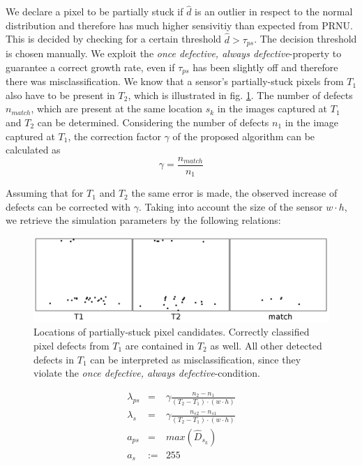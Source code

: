 \documentclass[10pt,twocolumn,letterpaper]{article}
\begin{document}
We declare a pixel to be partially stuck if $\hat{d}$ is an outlier in respect to the normal distribution and therefore has much higher sensivitiy than expected from PRNU. This is decided by checking for a certain threshold $\hat{d} > \tau_{ps}$. The decision threshold is chosen manually. We exploit the \emph{once defective, always defective}-property to guarantee a correct growth rate, even if $\tau_{ps}$ has been slightly off and therefore there was misclassification. We know that a sensor's partially-stuck pixels from $T_1$ also have to be present in $T_2$, which is illustrated in fig. \ref{fig:defectPersistence}. The number of defects $n_{match}$, which are present at the same location $s_k$ in the images captured at $T_1$ and $T_2$ can be determined. Considering the number of defects $n_1$ in the image captured at $T_1$, the correction factor $\gamma$ of the proposed algorithm can be calculated as
\begin{equation}
\gamma = \frac{n_{match}}{n_1}
\end{equation}

Assuming that for $T_1$ and $T_2$ the same error is made, the observed increase of defects can be corrected with $\gamma$. Taking into account the size of the sensor $w\cdot h$, we retrieve the simulation parameters by the following relations: 

\begin{figure}
  \centering
  \includegraphics[width=\linewidth]{img/detectedLocations.png}
  \caption{Locations of partially-stuck pixel candidates. Correctly classified pixel defects from $T_1$ are contained in $T_2$ as well. All other detected defects in $T_1$ can be interpreted as misclassification, since they violate the \emph{once defective, always defective}-condition.}
  \label{fig:defectPersistence}
\end{figure}


\begin{eqnarray}
 \lambda_{ps} 	& = 	& \gamma \frac{n_2-n_1}{(T_2-T_1)\cdot(w \cdot h)} \\ 
 \lambda_{s} 	& = 	& \gamma  \frac{n_{s2}-n_{s1}}{(T_2-T_1)\cdot(w \cdot h)} \\
 a_{ps} 	& = 	&max(\hat{D}_{s_k}) \\ 
 a_{s} 		&:= 	& 255
\end{eqnarray}
\end{document}
